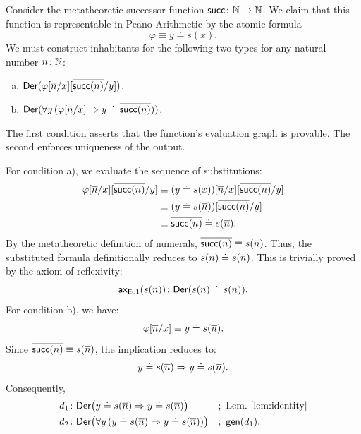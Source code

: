 \begin{xmpl}
    Consider the metatheoretic successor function $\fun{succ}\colon\N\to\N$. We claim that this function is representable in Peano Arithmetic by the atomic formula
    \[
        \varphi \equiv y \doteq s(x).
    \]
    We must construct inhabitants for the following two types for any natural number $n\colon\N$:
    \begin{enumerate}[a),font=\upshape]
        \item $\mathsf{Der}(\varphi[{\overline{n}}/x][{\overline{\mathsf{succ}(n)}}/y])$.
        \item $\mathsf{Der}(\forall y\,(\varphi[{\overline{n}}/x] \mathrel{\Rightarrow} y \doteq {\overline{\mathsf{succ}(n)}}))$.
    \end{enumerate}
    The first condition asserts that the function's evaluation graph is provable. The second enforces uniqueness of the output.
    
    For condition a), we evaluate the sequence of substitutions:
    \begin{align*}
        \varphi[{\overline{n}}/x][{\overline{\mathsf{succ}(n)}}/y]
            &\equiv(y\doteq s(x))[{\overline{n}}/x][{\overline{\mathsf{succ}(n)}}/y]\\
            &\equiv(y\doteq s({\overline{n}}))[{\overline{\mathsf{succ}(n)}}/y]\\
            &\equiv{\overline{\mathsf{succ}(n)}}\doteq s({\overline{n}}).
    \end{align*}
    By the metatheoretic definition of numerals, ${\overline{\mathsf{succ}(n)}}\equiv s({\overline{n}})$. Thus, the substituted formula definitionally reduces to $s({\overline{n}})\doteq s({\overline{n}})$. This is trivially proved by the axiom of reflexivity:
    \[
        \fun{ax}_{\fun{Eq1}}(s(\num{n}))\colon
            \fun{Der}(s(\num n)\doteq s(\num n)).
    \]
    For condition b), we have:
    \[
        \varphi[{\overline{n}}/x]\equiv y\doteq s({\overline{n}}).
    \]
    Since ${\overline{\mathsf{succ}(n)}}\equiv s({\overline{n}})$, the implication reduces to:
    \[
        y\doteq s({\overline{n}})\mathrel{\Rightarrow} y\doteq s({\overline{n}}).
    \]
    Consequently,
    {\small
    \begin{align*}
        d_1&\colon\fun{Der}\bigl(
            y\doteq s(\num n)\imp y\doteq s(\num n)
        \bigr)
            &&;\ \text{Lem.~\ref{lem:identity}}\\
        d_2&\colon\fun{Der}\bigl(
            \forall y\,(
                y\doteq s(\num{n})\imp y\doteq s(\num n)
            )
        \bigr)
            &&;\ \fun{gen}(d_1).
    \end{align*}}
\end{xmpl}

